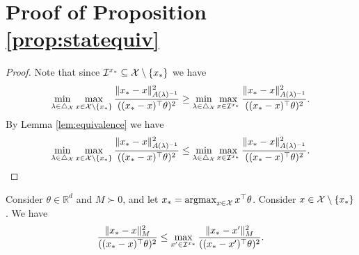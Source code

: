 \section{Proof of Proposition \ref{prop:statequiv}}\label{appendixadditional}
\begin{proof}
    Note that since $\mathcal{I}^{x_*} \subseteq \mathcal{X} \setminus \{x_*\}$ we have $$\min_{\lambda \in \triangle_{\mathcal{X}}} \max_{x \in \mathcal{X} \setminus \{x_*\}} \frac{\|x_* -x\|^2_{A(\lambda)^{-1}}}{((x_* - x)^\top\theta)^2} \geq \min_{\lambda \in \triangle_{\mathcal{X}}} \max_{x \in \mathcal{I}^{x_*}} \frac{\|x_* -x\|^2_{A(\lambda)^{-1}}}{((x_* - x)^\top\theta)^2}. $$
    By Lemma \ref{lem:equivalence} we have 
    $$\min_{\lambda \in \triangle_{\mathcal{X}}} \max_{x \in \mathcal{X} \setminus \{x_*\}} \frac{\|x_* -x\|^2_{A(\lambda)^{-1}}}{((x_* - x)^\top\theta)^2} \leq \min_{\lambda \in \triangle_{\mathcal{X}}} \max_{x \in \mathcal{I}^{x_*}} \frac{\|x_* -x\|^2_{A(\lambda)^{-1}}}{((x_* - x)^\top\theta)^2}. $$
\end{proof}
\begin{lemma}\label{lem:equivalence}
    Consider $\theta \in \mathbb{R}^d$ and $M \succ 0$, and let $x_* = \operatorname*{argmax}_{x \in \mathcal{X}}x^\top\theta$. Consider $x \in \mathcal{X} \setminus \{x_*\}$. We have $$\frac{\|x_* - x\|_{M}^{2}}{((x_* - x)^{\top}\theta)^{2}}  \leq\max_{x' \in \mathcal{I}^{x_*}}\frac{\|x_* - x'\|_{M}^{2}}{((x_* - x')^{\top}\theta)^{2}}.$$
\end{lemma}
